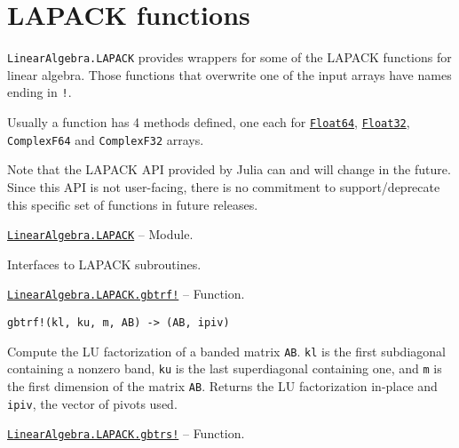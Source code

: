 \hypertarget{12227093091679014988}{}


\section{LAPACK functions}



\texttt{LinearAlgebra.LAPACK} provides wrappers for some of the LAPACK functions for linear algebra.  Those functions that overwrite one of the input arrays have names ending in \texttt{{\textquotesingle}!{\textquotesingle}}.



Usually a function has 4 methods defined, one each for \hyperlink{5027751419500983000}{\texttt{Float64}}, \hyperlink{8101639384272933082}{\texttt{Float32}}, \texttt{ComplexF64} and \texttt{ComplexF32} arrays.



Note that the LAPACK API provided by Julia can and will change in the future. Since this API is not user-facing, there is no commitment to support/deprecate this specific set of functions in future releases.


\hypertarget{5713679047114421298}{}
\hyperlink{5713679047114421298}{\texttt{LinearAlgebra.LAPACK}}  -- {Module.}

\begin{adjustwidth}{2em}{0pt}

Interfaces to LAPACK subroutines.



\end{adjustwidth}
\hypertarget{4626964766607452194}{}
\hyperlink{4626964766607452194}{\texttt{LinearAlgebra.LAPACK.gbtrf!}}  -- {Function.}

\begin{adjustwidth}{2em}{0pt}


\begin{verbatim}
gbtrf!(kl, ku, m, AB) -> (AB, ipiv)
\end{verbatim}

Compute the LU factorization of a banded matrix \texttt{AB}. \texttt{kl} is the first subdiagonal containing a nonzero band, \texttt{ku} is the last superdiagonal containing one, and \texttt{m} is the first dimension of the matrix \texttt{AB}. Returns the LU factorization in-place and \texttt{ipiv}, the vector of pivots used.



\end{adjustwidth}
\hypertarget{6545699816764482655}{}
\hyperlink{6545699816764482655}{\texttt{LinearAlgebra.LAPACK.gbtrs!}}  -- {Function.}

